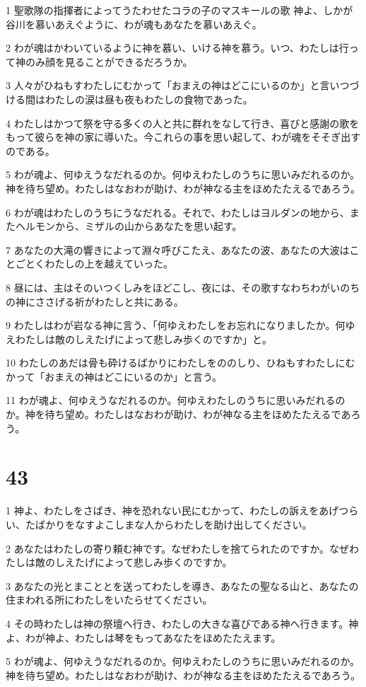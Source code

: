 \par 1 聖歌隊の指揮者によってうたわせたコラの子のマスキールの歌 神よ、しかが谷川を慕いあえぐように、わが魂もあなたを慕いあえぐ。
\par 2 わが魂はかわいているように神を慕い、いける神を慕う。いつ、わたしは行って神のみ顔を見ることができるだろうか。
\par 3 人々がひねもすわたしにむかって「おまえの神はどこにいるのか」と言いつづける間はわたしの涙は昼も夜もわたしの食物であった。
\par 4 わたしはかつて祭を守る多くの人と共に群れをなして行き、喜びと感謝の歌をもって彼らを神の家に導いた。今これらの事を思い起して、わが魂をそそぎ出すのである。
\par 5 わが魂よ、何ゆえうなだれるのか。何ゆえわたしのうちに思いみだれるのか。神を待ち望め。わたしはなおわが助け、わが神なる主をほめたたえるであろう。
\par 6 わが魂はわたしのうちにうなだれる。それで、わたしはヨルダンの地から、またヘルモンから、ミザルの山からあなたを思い起す。
\par 7 あなたの大滝の響きによって淵々呼びこたえ、あなたの波、あなたの大波はことごとくわたしの上を越えていった。
\par 8 昼には、主はそのいつくしみをほどこし、夜には、その歌すなわちわがいのちの神にささげる祈がわたしと共にある。
\par 9 わたしはわが岩なる神に言う、「何ゆえわたしをお忘れになりましたか。何ゆえわたしは敵のしえたげによって悲しみ歩くのですか」と。
\par 10 わたしのあだは骨も砕けるばかりにわたしをののしり、ひねもすわたしにむかって「おまえの神はどこにいるのか」と言う。
\par 11 わが魂よ、何ゆえうなだれるのか。何ゆえわたしのうちに思いみだれるのか。神を待ち望め。わたしはなおわが助け、わが神なる主をほめたたえるであろう。

\chapter{43}

\par 1 神よ、わたしをさばき、神を恐れない民にむかって、わたしの訴えをあげつらい、たばかりをなすよこしまな人からわたしを助け出してください。
\par 2 あなたはわたしの寄り頼む神です。なぜわたしを捨てられたのですか。なぜわたしは敵のしえたげによって悲しみ歩くのですか。
\par 3 あなたの光とまこととを送ってわたしを導き、あなたの聖なる山と、あなたの住まわれる所にわたしをいたらせてください。
\par 4 その時わたしは神の祭壇へ行き、わたしの大きな喜びである神へ行きます。神よ、わが神よ、わたしは琴をもってあなたをほめたたえます。
\par 5 わが魂よ、何ゆえうなだれるのか。何ゆえわたしのうちに思いみだれるのか。神を待ち望め。わたしはなおわが助け、わが神なる主をほめたたえるであろう。

